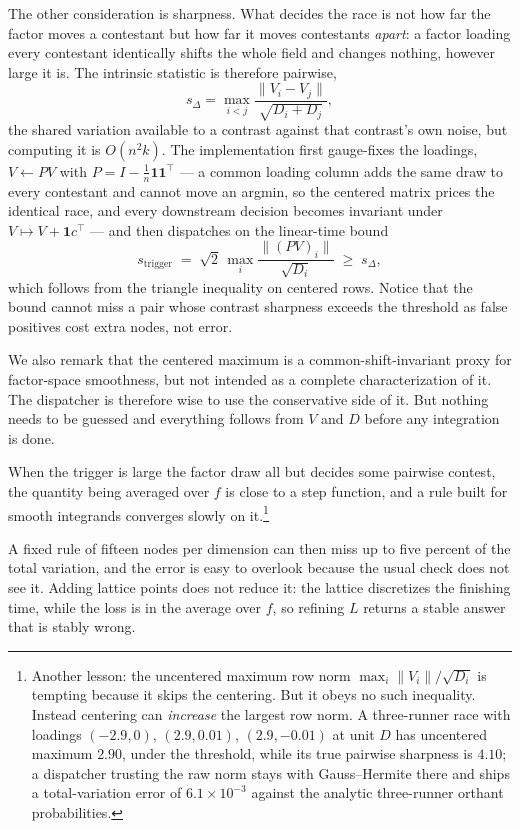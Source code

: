 \documentclass[11pt]{article}
\begin{document}
The other consideration is sharpness. What decides the race is not how
far the factor moves a contestant but how far it moves contestants
\emph{apart}: a factor loading every contestant identically shifts the
whole field and changes nothing, however large it is. The intrinsic
statistic is therefore pairwise,
\[
s_{\Delta}=\max_{i<j}\frac{\lVert V_i-V_j\rVert}{\sqrt{D_i+D_j}},
\]
the shared variation available to a contrast against that contrast's own
noise, but computing it is $O(n^2 k)$. The implementation first
gauge-fixes the loadings, $V\leftarrow PV$ with
$P=I-\tfrac1n\mathbf{1}\mathbf{1}^{\top}$ --- a common loading column
adds the same draw to every contestant and cannot move an argmin, so the
centered matrix prices the identical race, and every downstream decision
becomes invariant under $V\mapsto V+\mathbf{1}c^{\top}$ --- and then
dispatches on the linear-time bound
\[
s_{\mathrm{trigger}}\;=\;\sqrt2\,
\max_i \frac{\lVert (PV)_i\rVert}{\sqrt{D_i}}\;\ge\;s_{\Delta},
\]
which follows from the triangle inequality on centered rows. Notice that the bound cannot miss a pair whose contrast sharpness exceeds the threshold as false positives cost extra nodes, not error.

We also remark that the centered maximum is a
common-shift-invariant proxy for factor-space smoothness, but not intended as a complete
characterization of it. The dispatcher is therefore wise to use the
conservative side of it. But nothing needs to be guessed and everything follows
from $V$ and $D$ before any integration is done.

When the trigger is large the factor draw all but decides some pairwise contest, the
quantity being averaged over $f$ is close to a step function, and a rule
built for smooth integrands converges slowly on it.\footnote{Another lesson: the uncentered
maximum row norm $\max_i\lVert V_i\rVert/\sqrt{D_i}$ is tempting because
it skips the centering. But it obeys no such inequality. Instead centering can
\emph{increase} the largest row norm. A three-runner race with loadings
$(-2.9,0)$, $(2.9,0.01)$, $(2.9,-0.01)$ at unit $D$ has uncentered
maximum $2.90$, under the threshold, while its true pairwise sharpness
is $4.10$; a dispatcher trusting the raw norm stays with Gauss--Hermite
there and ships a total-variation error of $6.1\times10^{-3}$ against
the analytic three-runner orthant probabilities.}

A fixed rule of fifteen nodes per dimension can then miss up to five
percent of the total variation, and the error is easy to overlook because
the usual check does not see it. Adding lattice points does not reduce
it: the lattice discretizes the finishing time, while the loss is in the
average over $f$, so refining $L$ returns a stable answer that is stably
wrong.
\end{document}
